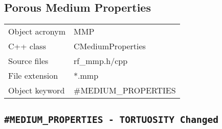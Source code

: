 \textcolor[rgb]{0.98,0.00,0.00}{\section{Porous Medium Properties}}

\begin{tabular*}{8.35cm}{|p{2.5cm}|p{5cm}|} \hline
Object acronym & MMP \\
C++ class      & CMediumProperties \\
Source files   & rf\_mmp.h/cpp \\
\hline
File extension & *.mmp \\
Object keyword & \#MEDIUM\_PROPERTIES \\
\hline
\end{tabular*}

\textcolor[rgb]{0.98,0.00,0.00}{\subsection{\texttt{\bf\#MEDIUM\_PROPERTIES - TORTUOSITY Changed}}}


